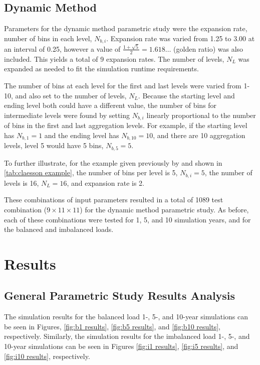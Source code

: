 \documentclass[review,12pt]{elsarticle}
\begin{document}
\subsection{Dynamic Method}
\label{subsec:agg:method:dynamic}

Parameters for the dynamic method parametric study were the expansion rate, number of bins in each level, $N_{b,i}$. Expansion rate was varied from 1.25 to 3.00 at an interval of 0.25, however a value of $\frac{1+\sqrt{5}}{2} = 1.618\ldots$ (golden ratio) was also included. This yields a total of 9 expansion rates. The number of levels, $N_L$ was expanded as needed to fit the simulation runtime requirements.

The number of bins at each level for the first and last levels were varied from 1-10, and also set to the number of levels, $N_L$. Because the starting level and ending level both could have a different value, the number of bins for intermediate levels were found by setting $N_{b,i}$ linearly proportional to the number of bins in the first and last aggregation levels. For example, if the starting level has $N_{b,1} = 1$ and the ending level has $N_{b,10} = 10$, and there are 10 aggregation levels, level 5 would have 5 bins, $N_{b,5} = 5$.

To further illustrate, for the example given previously by \cite{ClaessonJaved2012} and shown in \ref{tab:claesson example}, the number of bins per level is 5, $N_{b,i} = 5$, the number of levels is 16, $N_L = 16$, and expansion rate is 2.

These combinations of input parameters resulted in a total of 1089 test combination ($9 \times 11 \times 11$) for the dynamic method parametric study. As before, each of these combinations were tested for 1, 5, and 10 simulation years, and for the balanced and imbalanced loads.

\section{Results}

\subsection{General Parametric Study Results Analysis}

The simulation results for the balanced load 1-, 5-, and 10-year simulations can be seen in Figures, \ref{fig:b1 results}, \ref{fig:b5 results}, and \ref{fig:b10 results}, respectively. Similarly, the simulation results for the imbalanced load 1-, 5-, and 10-year simulations can be seen in Figures \ref{fig:i1 results}, \ref{fig:i5 results}, and \ref{fig:i10 results}, respectively.
\end{document}
